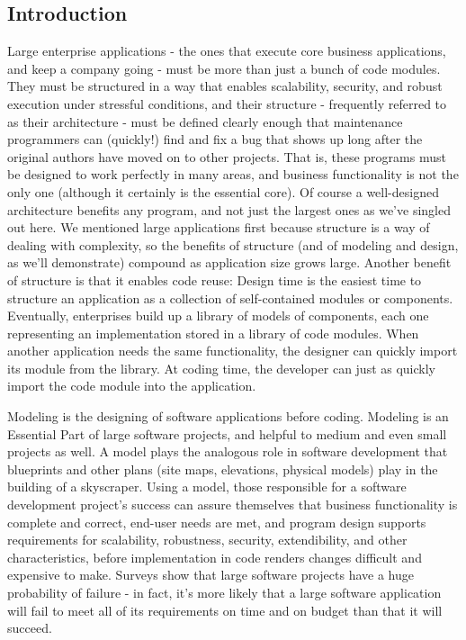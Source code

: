 \subsection{Introduction}
\label{subsec:subsec01}
Large enterprise applications - the ones that execute core business applications, and keep a company going - must be more than just a bunch of code modules. 
They must be structured in a way that enables scalability, security, and robust execution under stressful conditions, and their structure - frequently referred 
to as their architecture - must be defined clearly enough that maintenance programmers can (quickly!) find and fix a bug that shows up long after the original 
authors have moved on to other projects. That is, these programs must be designed to work perfectly in many areas, and business functionality is not the 
only one (although it certainly is the essential core). Of course a well-designed architecture benefits any program, and not just the largest ones as we've 
singled out here. We mentioned large applications first because structure is a way of dealing with complexity, so the benefits of structure (and of modeling 
and design, as we'll demonstrate) compound as application size grows large. Another benefit of structure is that it enables code reuse: Design time is the 
easiest time to structure an application as a collection of self-contained modules or components. Eventually, enterprises build up a library of models of 
components, each one representing an implementation stored in a library of code modules. When another application needs the same functionality, 
the designer can quickly import its module from the library. At coding time, the developer can just as quickly import the code module into the application.  

Modeling is the designing of software applications before coding. Modeling is an Essential Part of large software projects, and helpful to medium and even 
small projects as well. A model plays the analogous role in software development that blueprints and other plans (site maps, elevations, physical models) 
play in the building of a skyscraper. Using a model, those responsible for a software development project's success can assure themselves that business 
functionality is complete and correct, end-user needs are met, and program design supports requirements for scalability, robustness, security, extendibility, 
and other characteristics, before implementation in code renders changes difficult and expensive to make. Surveys show that large software projects have a 
huge probability of failure - in fact, it's more likely that a large software application will fail to meet all of its requirements on time and on budget 
than that it will succeed. 
